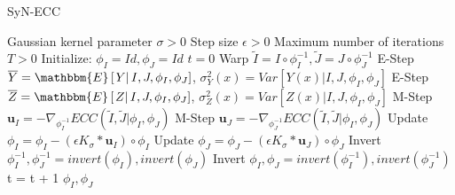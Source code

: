 \begin{algorithm}[h!]
\caption{SyN-ECC}\label{alg:SyNECC}
\begin{algorithmic}[1]
\REQUIRE Gaussian kernel parameter $\sigma>0$
\REQUIRE Step size $\epsilon>0$
\REQUIRE Maximum number of iterations $T>0$
\STATE Initialize: $\phi_{I} = Id, \phi_{J} = Id$
\STATE $t=0$
\REPEAT
    \STATE Warp $\tilde{I}  = I \circ \phi_{I}^{-1}, \tilde{J} = J \circ \phi_{J}^{-1}$
    \STATE E-Step $\overline{Y} = \mathbbm{E}\left[\left.Y\right| I, J, \phi_{I}, \phi_{J}\right]$, $\sigma^{2}_{Y}(x) = Var\left[\left.Y(x)\right| I, J, \phi_{I}, \phi_{J}\right]$
    \STATE E-Step $\overline{Z} = \mathbbm{E}\left[\left.Z\right| I, J, \phi_{I}, \phi_{J}\right]$, $\sigma^{2}_{Z}(x) = Var\left[\left.Z(x)\right| I, J, \phi_{I}, \phi_{J}\right]$
    \STATE M-Step $\mathbf{u}_{I} = - \nabla_{\phi^{-1}_{I}} ECC(\tilde{I}, \tilde{J} | \phi_{I}, \phi_{J})$
    \STATE M-Step $\mathbf{u}_{J} = - \nabla_{\phi^{-1}_{J}} ECC(\tilde{I}, \tilde{J} | \phi_{I}, \phi_{J})$
    \STATE Update $\phi_{I} = \phi_{I} - \left(\epsilon K_{\sigma} \ast \mathbf{u}_{I} \right)\circ \phi_{I}$
    \STATE Update $\phi_{J} = \phi_{J} - \left(\epsilon K_{\sigma} \ast \mathbf{u}_{J} \right)\circ \phi_{J}$
    \STATE Invert $\phi_{I}^{-1}, \phi_{J}^{-1} = invert(\phi_{I}), invert(\phi_{J})$
    \STATE Invert $\phi_{I}, \phi_{J} = invert(\phi_{I}^{-1}), invert(\phi_{J}^{-1})$
    \STATE t = t + 1
\RETURN $\phi_{I}, \phi_{J}$
\end{algorithmic}
\end{algorithm}
